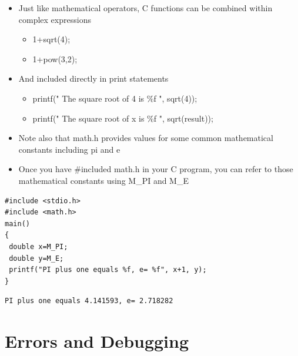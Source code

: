 \documentclass{beamer}
\begin{document}
\begin{frame}
\begin{itemize}
\item Just like mathematical operators, C functions can be combined within complex expressions

\begin{itemize}
\item 1+sqrt(4);
\item 1+pow(3,2);
\end{itemize}

\item And included directly in print statements

\begin{itemize}
\item printf(" The square root of 4 is \%f ", sqrt(4));
\item printf(" The square root of x is \%f ", sqrt(result));
\end{itemize}

\end{itemize}
\end{frame}

\begin{frame}[fragile]
\begin{itemize}

\item Note also that math.h provides values for some common mathematical constants including pi and e
\item Once you have \#included math.h in your C program, you can refer to those mathematical constants using M\_PI and M\_E
\end{itemize}

\begin{block}{}
\begin{lstlisting}
#include <stdio.h>
#include <math.h>
main()
{
 double x=M_PI;
 double y=M_E; 
 printf("PI plus one equals %f, e= %f", x+1, y); 
}
\end{lstlisting}
\end{block}

\begin{block}{}
\begin{lstlisting}
PI plus one equals 4.141593, e= 2.718282
\end{lstlisting}
\end{block}
\end{frame}

\section{Errors and Debugging}
\end{document}
